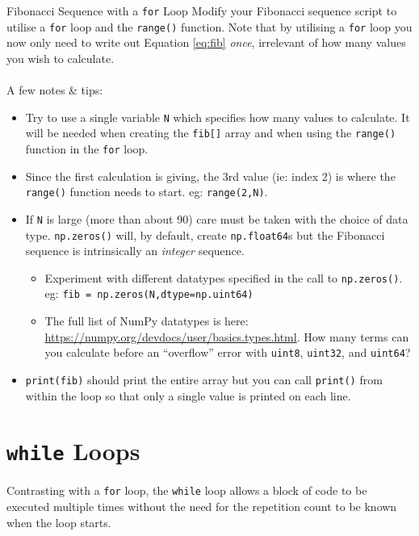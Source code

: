 \documentclass{lab}
\begin{document}
\begin{task}{Fibonacci Sequence with a \texttt{for} Loop}{}
Modify your Fibonacci sequence script to utilise a \texttt{for} loop and the \texttt{range()} function. Note that by utilising a \texttt{for} loop you now only need to write out Equation \ref{eq:fib} \textit{once}, irrelevant of how many values you wish to calculate.
\\~\\
A few notes \& tips:
\\
\begin{itemize}
\item Try to use a single variable \texttt{N} which specifies how many values to calculate. It will be needed when creating the \texttt{fib[]} array and when using the \texttt{range()} function in the \texttt{for} loop.
\item Since the first calculation is giving, the 3rd value (ie: index 2) is where the \texttt{range()} function needs to start. eg: \texttt{range(2,N)}.
\item If \texttt{N} is large (more than about 90) care must be taken with the choice of data type. \texttt{np.zeros()} will, by default, create \texttt{np.float64}s but the Fibonacci sequence is intrinsically an \textit{integer} sequence.

\begin{itemize}
\item Experiment with different datatypes specified in the call to \texttt{np.zeros()}. eg: \texttt{fib = np.zeros(N,dtype=np.uint64)}
\item The full list of NumPy datatypes is here: \url{https://numpy.org/devdocs/user/basics.types.html}. How many terms can you calculate before an ``overflow'' error with \texttt{uint8}, \texttt{uint32}, and \texttt{uint64}?
\end{itemize}
\item \texttt{print(fib)} should print the entire array but you can call \texttt{print()} from within the loop so that only a single value is printed on each line.
\end{itemize}
\end{task}

\pagebreak

\section{\texttt{while} Loops}

Contrasting with a \texttt{for} loop, the \texttt{while} loop allows a block of code to be executed multiple times without the need for the repetition count to be known when the loop starts.
\end{document}
